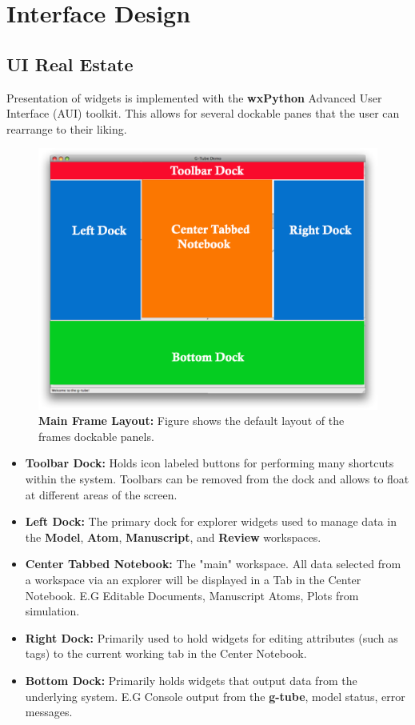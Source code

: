 \documentclass[12pt]{article}
\begin{document}
\section*{Interface Design}

\subsection*{UI Real Estate}

Presentation of widgets is implemented with the {\bf wxPython} Advanced User Interface (AUI) toolkit. This allows for several dockable panes that the user can rearrange to their liking. 

\begin{figure}[ht]
   \centering
   \includegraphics[scale=0.6]{figures/RealEstate.eps}
   \caption{{\bf Main Frame Layout:} Figure shows the default layout of the frames dockable panels.}
   \label{fig:Real Estate}
\end{figure}

\begin{itemize}
\item[] {\bf Toolbar Dock:} Holds icon labeled buttons for performing many shortcuts within the system. Toolbars can be removed from the dock and allows to float at different areas of the screen.
\item[] {\bf Left Dock:} The primary dock for explorer widgets used to manage data in the {\bf Model}, {\bf Atom}, {\bf Manuscript}, and {\bf Review} workspaces.
\item[] {\bf Center Tabbed Notebook:} The "main" workspace. All data selected from a workspace via an explorer will be displayed in a Tab in the Center Notebook. E.G Editable Documents, Manuscript Atoms, Plots from simulation.
\item[] {\bf Right Dock:} Primarily used to hold widgets for editing attributes (such as tags) to the current working tab in the Center Notebook.
\item[] {\bf Bottom Dock:} Primarily holds widgets that output data from the underlying system. E.G Console output from the {\bf g-tube}, model status, error messages.
\end{itemize}
\end{document}
